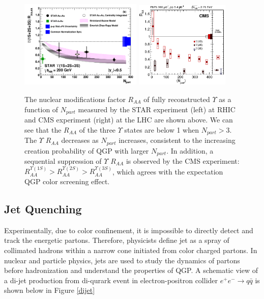 \begin{figure}[hbtp]
\begin{center}
\includegraphics[width=0.52\textwidth]{Figures/Chapter1/STARUpsilon.png}
\includegraphics[width=0.40\textwidth]{Figures/Chapter1/CMSUpsilon.png}
\caption{The nuclear modifications factor $R_{AA}$ of fully reconstructed $\Upsilon$ as a function of $N_{part}$ measured by the STAR experiment (left) at RHIC and CMS experiment (right) at the LHC are shown above. We can see that the $R_{AA}$ of the three $\Upsilon$ states are below 1 when $N_{part} > 3$. The $\Upsilon$ $R_{AA}$ decreases as $N_{part}$ increases, consistent to the increasing creation probability of QGP with larger $N_{part}$. In addition, a sequential suppression of $\Upsilon$ $R_{AA}$ is observed by the CMS experiment: $R_{AA}^{\Upsilon(1S)} > R_{AA}^{\Upsilon(2S)} > R_{AA}^{\Upsilon(3S)}$, which agrees with the expectation QGP color screening effect.}
\label{UpsilonSupp}
\end{center}
\end{figure} 


\subsection{Jet Quenching} 

Experimentally, due to color confinement, it is impossible to directly detect and track the energetic partons. Therefore, physicists define jet as a spray of collimated hadrons within a narrow cone initiated from color charged partons. In nuclear and particle physics, jets are used to study the dynamics of partons before hadronization \cite{HERAJET} and understand the properties of QGP. A schematic view of a di-jet production from di-qurark event in electron-positron collider $e^+e^-\rightarrow q \bar q$ is shown below in Figure \ref{dijet}


